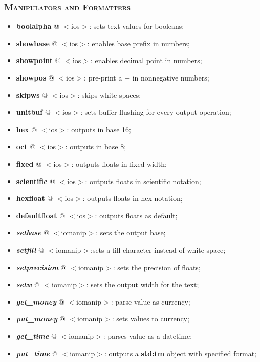 \documentclass[10pt]{article}
\begin{document}
\begin{multicols*}{5}
{\subsubsection*{\textsc{Manipulators and Formatters}} 
\begin{itemize}[leftmargin=*,topsep=0.25pt]
  \setlength\itemsep{-1.8pt}
	\item \textbf{boolalpha} @ $<$ios$>$: sets text values for booleans;
	\item \textbf{showbase} @ $<$ios$>$: enables base prefix in numbers;
	\item \textbf{showpoint} @ $<$ios$>$: enables decimal point in numbers;
	\item \textbf{showpos} @ $<$ios$>$: pre-print a $+$ in nonnegative numbers;
	\item \textbf{skipws} @ $<$ios$>$: skips white spaces;
	\item \textbf{unitbuf} @ $<$ios$>$: sets buffer flushing for every output operation;
	\item \textbf{hex} @ $<$ios$>$: outputs in base 16;
	\item \textbf{oct} @ $<$ios$>$: outputs in base 8;
	\item \textbf{fixed} @ $<$ios$>$: outputs floats in fixed width;
	\item \textbf{scientific} @ $<$ios$>$: outputs floats in scientific notation;
	\item \textbf{hexfloat} @ $<$ios$>$: outputs floats in hex notation;
	\item \textbf{defaultfloat} @ $<$ios$>$: outputs floats as default;
	\item \emph{\textbf{setbase}} @ $<$iomanip$>$: sets the output base;
	\item \emph{\textbf{setfill}} @ $<$iomanip$>$:sets a fill character instead of white space;
	\item \emph{\textbf{setprecision}} @ $<$iomanip$>$: sets the precision of floats;
	\item \emph{\textbf{setw}} @ $<$iomanip$>$: sets the output width for the text;
	\item \emph{\textbf{get\_money}} @ $<$iomanip$>$: parse value as currency;
	\item \emph{\textbf{put\_money}} @ $<$iomanip$>$: sets values to currency;
	\item \emph{\textbf{get\_time}} @ $<$iomanip$>$: parses value as a datetime;
	\item \emph{\textbf{put\_time}} @ $<$iomanip$>$: outputs a \textbf{std:tm} object with specified format;

\end{itemize}}
\end{multicols*}
\end{document}
